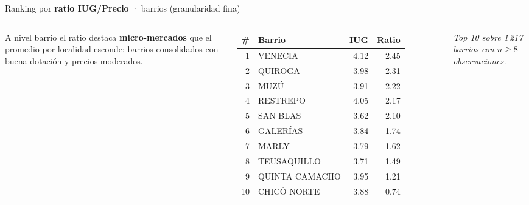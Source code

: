 \documentclass[aspectratio=169,11pt]{beamer}
\newcommand{\hi}[1]{\textcolor{inmuGreen}{\textbf{#1}}}
\begin{document}
\begin{frame}{Ranking por \hi{ratio IUG/Precio} · barrios (granularidad fina)}
  \begin{columns}[T,onlytextwidth]
      \scriptsize
      A nivel barrio el ratio destaca \hi{micro-mercados} que el
      promedio por localidad esconde: barrios consolidados con
      buena dotación y precios moderados.
      \vspace{0.6em}

      \begin{tabular}{rlrr}
        \toprule
        \# & \textbf{Barrio} & \textbf{IUG} & \textbf{Ratio}\\
        \midrule
        1 & VENECIA           & 4.12 & 2.45 \\
        2 & QUIROGA           & 3.98 & 2.31 \\
        3 & MUZÚ              & 3.91 & 2.22 \\
        4 & RESTREPO          & 4.05 & 2.17 \\
        5 & SAN BLAS          & 3.62 & 2.10 \\
        6 & GALERÍAS          & 3.84 & 1.74 \\
        7 & MARLY             & 3.79 & 1.62 \\
        8 & TEUSAQUILLO       & 3.71 & 1.49 \\
        9 & QUINTA CAMACHO    & 3.95 & 1.21 \\
        10 & CHICÓ NORTE      & 3.88 & 0.74 \\
        \bottomrule
      \end{tabular}

      \vspace{0.5em}
      {\scriptsize\itshape\color{inmuMuted}
      Top 10 sobre 1\,217 barrios con $n \geq 8$ observaciones.}


\end{columns}
\end{frame}
\end{document}

